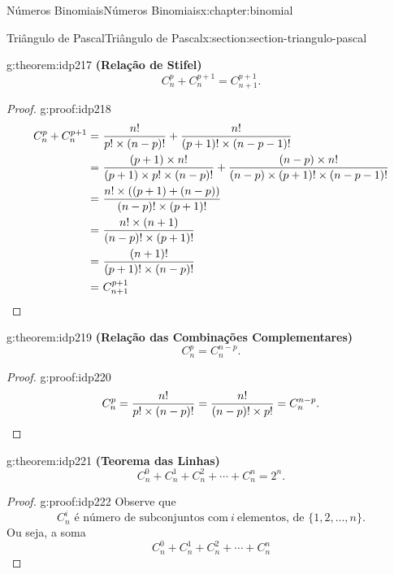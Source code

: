 \documentclass[oneside,10pt,]{book}
\newcommand{\terminology}[1]{\textbf{#1}}
\newcommand{\qedhere}{\relax}
\numberwithin{equation}{section}
\newcommand{\amp}{&}
\begin{document}
\begin{chapterptx}{Números Binomiais}{}{Números Binomiais}{}{}{x:chapter:binomial}
\begin{sectionptx}{Triângulo de Pascal}{}{Triângulo de Pascal}{}{}{x:section:section-triangulo-pascal}
\begin{theorem}{}{}{g:theorem:idp217}%
\terminology{(Relação de Stifel)}%
\begin{equation*}
C_n^p + C_n^{p+1} = C_{n+1}^{p+1}. 
\end{equation*}
\end{theorem}
\begin{proof}{}{g:proof:idp218}
%
\begin{align*}
C_n^p + C_n^{p+1}= \amp ~\frac{n!}{p!\times (n-p)!} + \frac{n!}{(p+1)!\times (n-p-1)!}   \\
= \amp ~ \frac{(p+1)\times n!}{(p+1)\times p!\times (n-p)!} + \frac{(n-p)\times n!}{(n-p)\times(p+1)!\times (n-p-1)!}  \\
= \amp ~ \frac{n!\times((p+1)+(n-p)) }{(n-p)!\times(p+1)!}  \\
= \amp ~ \frac{n!\times(n+1) }{(n-p)!\times(p+1)!}  \\
= \amp ~ \frac{(n+1)!}{(p+1)!\times (n-p)!}  \\
= \amp ~ C_{n+1}^{p+1}  \qedhere
\end{align*}
\end{proof}
\begin{theorem}{}{}{g:theorem:idp219}%
\terminology{(Relação das Combinações Complementares)}%
\begin{equation*}
C_n^p = C_n^{n-p}.
\end{equation*}
\end{theorem}
\begin{proof}{}{g:proof:idp220}
%
\begin{equation*}
C_n^p= \frac{n!}{p!\times (n-p)!} = \frac{n!}{(n-p)!\times p!} = C_n^{n-p}.\qedhere
\end{equation*}
\end{proof}
\begin{theorem}{}{}{g:theorem:idp221}%
\terminology{(Teorema das Linhas)}%
\begin{equation*}
C_n^0 + C_n^1 +C_n^2 + \cdots + C_n^n = 2^n.
\end{equation*}
\end{theorem}
\begin{proof}{}{g:proof:idp222}
Observe que%
%
\begin{equation*}
C_n^i \text{ é número de subconjuntos com}~ i ~\text{elementos, de } \{1, 2, \ldots, n\}. 
\end{equation*}
Ou seja, a soma%
\begin{equation*}
C_n^0 + C_n^1 +C_n^2 + \cdots + C_n^n
\end{equation*}

\end{proof}
\end{sectionptx}
\end{chapterptx}
\end{document}
